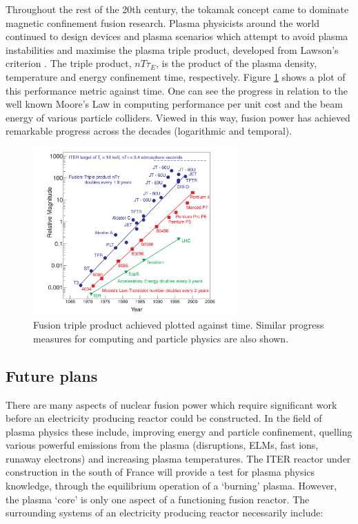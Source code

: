 Throughout the rest of the 20th century, the tokamak concept came to dominate magnetic confinement fusion research. Plasma physicists around the world continued to design devices and plasma scenarios which attempt to avoid plasma instabilities and maximise the plasma triple product, developed from Lawson's criterion \cite{lawson1955}. The triple product, $nT\tau_{E}$, is the product of the plasma density, temperature and energy confinement time, respectively. Figure \ref{fig:triple_product} shows a plot of this performance metric against time. One can see the progress in relation to the well known Moore's Law in computing performance per unit cost and the beam energy of various particle colliders. Viewed in this way, fusion power has achieved remarkable progress across the decades (logarithmic and temporal).

\begin{figure}
  \centering
  \includegraphics[width=0.7\textwidth]{triple_product.png}
  \caption{Fusion triple product achieved plotted against time. Similar progress measures for computing and particle physics are also shown.}
  \label{fig:triple_product}
\end{figure}

\subsection{Future plans}
There are many aspects of nuclear fusion power which require significant work before an electricity producing reactor could be constructed. In the field of plasma physics these include, improving energy and particle confinement, quelling various powerful emissions from the plasma (disruptions, ELMs, fast ions, runaway electrons) and increasing plasma temperatures. The ITER  reactor under construction in the south of France will provide a test for plasma physics knowledge, through the equilibrium operation of a `burning' plasma. However, the plasma `core' is only one aspect of a functioning fusion reactor. The surrounding systems of an electricity producing reactor necessarily include:

